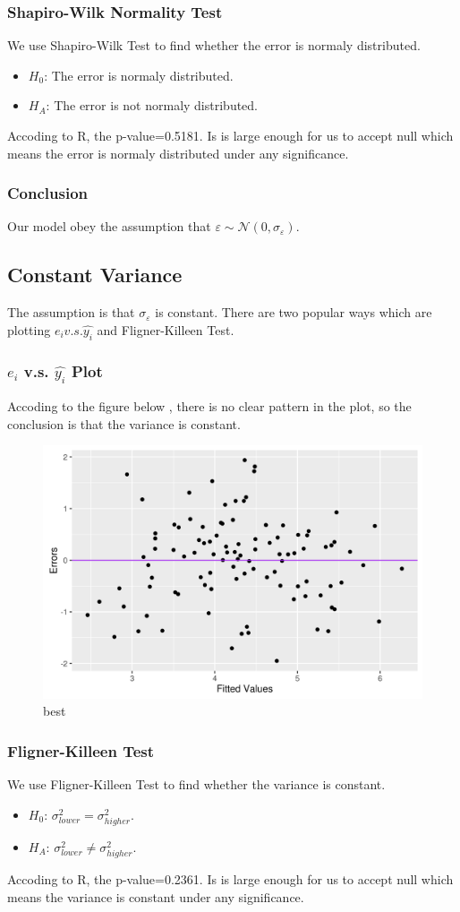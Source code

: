 \documentclass[a4paper,11pt,onecolumn,twoside]{article}
\begin{document}
\subsubsection{Shapiro-Wilk Normality Test}
We use Shapiro-Wilk Test to find whether the error is normaly distributed.
\begin{itemize}
	\item $H_0$: The error is normaly distributed.
	\item $H_A$: The error is not normaly distributed.
\end{itemize}
Accoding to R, the p-value=0.5181. Is is large enough for us to accept null which
means the error is normaly distributed under any significance.
\subsubsection{Conclusion}
Our model obey the assumption that $\varepsilon\sim \mathcal N(0,\sigma_{\varepsilon})$.  
\subsection{Constant Variance}
The assumption is that $\sigma_{\varepsilon}$ is constant. There are two popular ways which are plotting $e_i v.s. \hat{y_i}$ and Fligner-Killeen  Test.
\subsubsection{$e_i$ v.s. $\hat{y_i}$ Plot}
Accoding to the figure below , there is no clear pattern in the plot, so the conclusion is that the variance is constant.
 \begin{figure}[H]
	\centering
	\includegraphics[width=.65\textwidth,height=.30\textheight]{scatter_plot_constant_variance.png} %
	\caption{best} %
	\label{img} %
\end{figure}
\subsubsection{Fligner-Killeen  Test}
We use Fligner-Killeen Test to find whether the variance is constant.
\begin{itemize}
	\item $H_0$: $\sigma^2_{lower}=\sigma^2_{higher}$.
	\item $H_A$: $\sigma^2_{lower}\neq\sigma^2_{higher}$.
\end{itemize}
Accoding to R, the p-value=0.2361. Is is large enough for us to accept null which
means the variance is constant under any significance.
\end{document}
